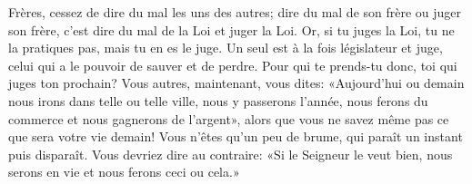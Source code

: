 Frères, cessez de dire du mal les uns des autres;
	dire du mal de son frère ou juger son frère,
	c’est dire du mal de la Loi et juger la Loi.
Or, si tu juges la Loi, tu ne la pratiques pas, mais tu en es le juge.
Un seul est à la fois législateur et juge,
	celui qui a le pouvoir de sauver et de perdre.
Pour qui te prends-tu donc, toi qui juges ton prochain?
Vous autres, maintenant, vous dites:
	«Aujourd’hui ou demain nous irons dans telle ou telle ville,
	nous y passerons l’année, nous ferons du commerce
	et nous gagnerons de l’argent»,
	alors que vous ne savez même pas ce que sera votre vie demain!
	Vous n’êtes qu’un peu de brume, qui paraît un instant puis disparaît.
Vous devriez dire au contraire:
	«Si le Seigneur le veut bien, nous serons en vie
	et nous ferons ceci ou cela.»
